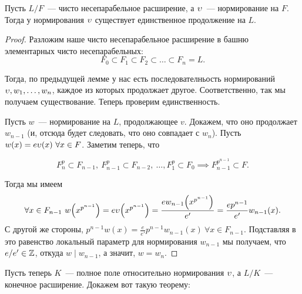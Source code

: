  	\begin{lemma} 
 		Пусть $L/F$~--- чисто несепарабельное расширение, а $\upsilon$~--- нормирование на $F$. Тогда у нормирования $\upsilon$ существует единственное продолжение на $L$.
 	\end{lemma}
 	\begin{proof}
 		Разложим наше чисто несепарабельное расширение в башню элементарных чисто несепарабельных: 
 		\[
 			F_0 \subset F_1 \subset F_2 \subset \ldots \subset F_n = L.
 		\]

 		Тогда, по предыдущей лемме у нас есть последователньость нормирований $\upsilon, w_1, \ldots, w_n$, каждое из которых продолжает другое. Соответственно, так мы получаем существование. Теперь проверим единственность. 

 		Пусть $w$~--- нормирование на $L$, продолжающее $v$. Докажем, что оно продолжает $w_{n - 1}$ (и, отсюда будет следовать, что оно совпадает с $w_{n}$). Пусть $w(x) = e\upsilon(x) \ \forall x \in F$. Заметим теперь, что

 		\[
 			F_n^{p} \subset F_{n - 1}, \ F_{n - 1}^{p} \subset F_{n - 2}, \ \ldots, F_1^p \subset F_0 \implies F_{n - 1}^{p^{n - 1}} \subset F.
 		\]

 		Тогда мы имеем 
 		\[ 
 		\forall x \in F_{n - 1} \ w\lr*{x^{p^{n - 1}}} = e\v\lr*{x^{p^{n - 1}}} = \frac{e w_{n - 1}\lr*{x^{p^{n - 1}}}}{e'} = \frac{e p^{n - 1}}{e'} w_{n - 1}(x).
 		\]
 		С другой же стороны, $p^{n - 1}w(x) = \frac{e}{e'} p^{n - 1}w_{n - 1}(x) \ \forall x \in F_{n - 1}$. Подставляя в это равенство локальный параметр для нормирования $w_{n - 1}$ мы получаем, что $e/e' \in \mathbb{Z}$, откуда $w \mid w_{n - 1}$, а значит, $w = w_{n}$.
 	\end{proof}

 	Пусть теперь $K$~--- полное поле относительно нормирования $\upsilon$, а $L/K$~--- конечное расширение. Докажем вот такую теорему: 


